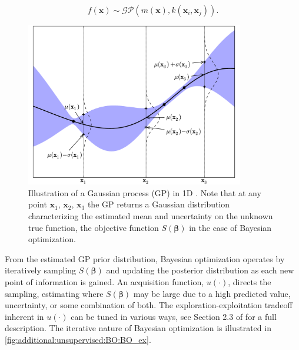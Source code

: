 \begin{equation}\label{eq:additional:unsupervised:BO:GP}
f\left(\bm{x}\right) \sim \mathcal{GP}\left(m\left(\bm{x}\right), k\left(\bm{x}_{i}, \bm{x}_{j}\right)\right).
\end{equation}

\begin{figure}
\centering
\includegraphics[width=0.85\textwidth]{figures/ml/gp.pdf}
\caption{
Illustration of a Gaussian process (GP) in 1D \cite{Brochu2010}.
Note that at any point $\bm{x}_{1}$, $\bm{x}_{2}$, $\bm{x}_{3}$ the GP
returns a Gaussian distribution characterizing the estimated mean and uncertainty on the
unknown true function, \ie the objective function $S\left(\bm{\beta}\right)$ in the case of Bayesian optimization.
}
\label{fig:additional:unsupervised:BO:GP_ex}
\end{figure}

From the estimated GP prior distribution, Bayesian optimization
operates by iteratively sampling $S\left(\bm{\beta}\right)$ and updating the posterior distribution
as each new point of information is gained.
An acquisition function, $u\left(\cdot\right)$, directs the sampling,
estimating where $S\left(\bm{\beta}\right)$ may be large
due to a high predicted value, uncertainty, or some combination of both.
The exploration-exploitation tradeoff inherent in $u\left(\cdot\right)$
can be tuned in various ways, see Section 2.3 of \cite{Brochu2010} for a full description.
The iterative nature of Bayesian optimization is illustrated in \cref{fig:additional:unsupervised:BO:BO_ex}.


